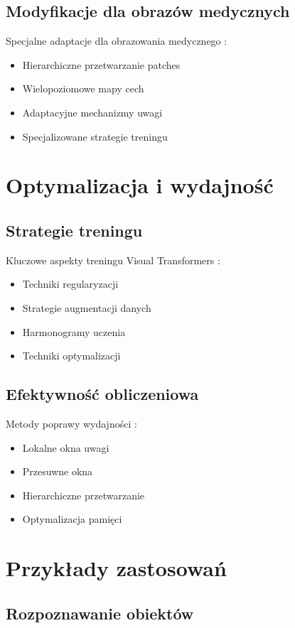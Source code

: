 \subsection{Modyfikacje dla obrazów medycznych}
Specjalne adaptacje dla obrazowania medycznego \cite{hatamizadeh2022swin}:
\begin{itemize}
    \item Hierarchiczne przetwarzanie patches
    \item Wielopoziomowe mapy cech
    \item Adaptacyjne mechanizmy uwagi
    \item Specjalizowane strategie treningu
\end{itemize}

\section{Optymalizacja i wydajność}
\subsection{Strategie treningu}
Kluczowe aspekty treningu Visual Transformers \cite{touvron2021training}:
\begin{itemize}
    \item Techniki regularyzacji
    \item Strategie augmentacji danych
    \item Harmonogramy uczenia
    \item Techniki optymalizacji
\end{itemize}

\subsection{Efektywność obliczeniowa}
Metody poprawy wydajności \cite{liu2021swin}:
\begin{itemize}
    \item Lokalne okna uwagi
    \item Przesuwne okna
    \item Hierarchiczne przetwarzanie
    \item Optymalizacja pamięci
\end{itemize}

\section{Przykłady zastosowań}
\subsection{Rozpoznawanie obiektów}
